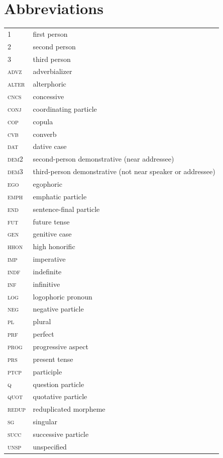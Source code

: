 \documentclass[output=paper]{langsci/langscibook}
\begin{document}
 
\section*{Abbreviations}


\begin{tabularx}{.85\textwidth}{lQ}
1 & first person\\
2 & second person\\ 
3 & third person\\ 
\textsc{advz} & adverbializer\\ 
\textsc{alter} & alterphoric\\ 
\textsc{cncs} & concessive\\ 
\textsc{conj} & coordinating particle\\ 
\textsc{cop} & copula\\ 
\textsc{cvb} & converb\\ 
\textsc{dat} & dative case\\ 
\textsc{dem}2 & second-person demonstrative (near addressee)\\ 
\textsc{dem}3 & third-person demonstrative (not near speaker or addressee)\\ 
\textsc{ego} & egophoric\\ 
\textsc{emph} & emphatic particle\\ 
\textsc{end} & sentence-final particle\\ 
\textsc{fut} & future tense\\ 
\textsc{gen} & genitive case\\ 
\textsc{hhon} & high honorific\\ 
\textsc{imp} & imperative\\ 
\textsc{indf} & indefinite\\ 
\textsc{inf} & infinitive\\ 
\textsc{log} & logophoric pronoun\\ 
\textsc{neg} & negative particle\\ 
\textsc{pl} & plural\\ 
\textsc{prf} & perfect\\ 
\textsc{prog} & progressive aspect\\ 
\textsc{prs} & present tense\\ 
\textsc{ptcp} & participle\\ 
\textsc{q} & question particle\\ 
\textsc{quot} & quotative particle\\ 
\textsc{redup} & reduplicated morpheme\\ 
\textsc{sg} & singular\\ 
\textsc{succ} & successive particle\\ 
\textsc{unsp} & unspecified\\
\end{tabularx}


\sloppy
\printbibliography[heading=subbibliography,notkeyword=this] 
\end{document}
